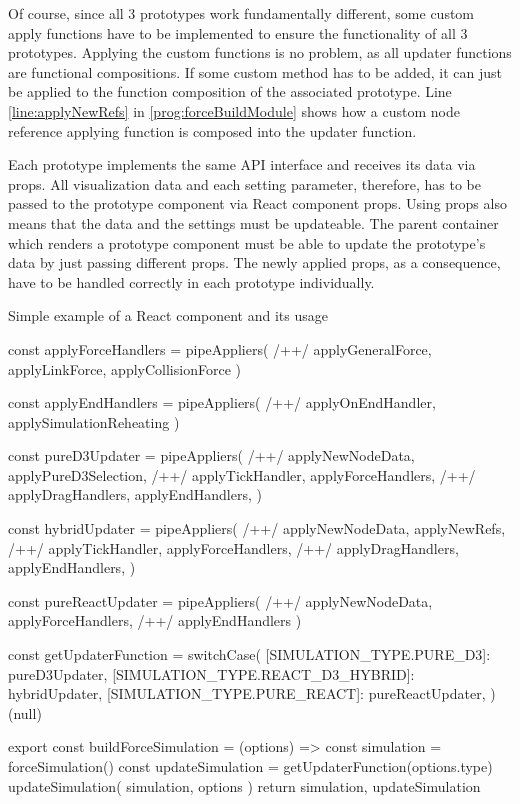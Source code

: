 Of course, since all 3 prototypes work fundamentally different, some custom apply functions have to be implemented to ensure the functionality of all 3 prototypes. Applying the custom functions is no problem, as all updater functions are functional compositions. If some custom method has to be added, it can just be applied to the function composition of the associated prototype. Line \ref{line:applyNewRefs} in \ref{prog:forceBuildModule} shows how a custom node reference applying function is composed into the updater function.

Each prototype implements the same API interface and receives its data via props. All visualization data and each setting parameter, therefore, has to be passed to the prototype component via React component props. Using props also means that the data and the settings must be updateable. The parent container which renders a prototype component must be able to update the prototype's data by just passing different props. The newly applied props, as a consequence, have to be handled correctly in each prototype individually.

\begin{program}[H]
\caption{Simple example of a React component and its usage} 
\label{prog:forceBuildModule}
\begin{JsCode}
const applyForceHandlers = pipeAppliers( /+\label{line:composition1}+/
  applyGeneralForce, 
  applyLinkForce, 
  applyCollisionForce
)

const applyEndHandlers = pipeAppliers( /+\label{line:composition2}+/
  applyOnEndHandler, 
  applySimulationReheating
)

const pureD3Updater = pipeAppliers( /+\label{line:updater1}+/
  applyNewNodeData,
  applyPureD3Selection, /+\label{line:applyPureD3Selection}+/
  applyTickHandler,
  applyForceHandlers, /+\label{line:applyForce1}+/
  applyDragHandlers,
  applyEndHandlers,
)

const hybridUpdater = pipeAppliers( /+\label{line:updater2}+/
  applyNewNodeData,
  applyNewRefs, /+\label{line:applyNewRefs}+/
  applyTickHandler,
  applyForceHandlers, /+\label{line:applyForce2}+/
  applyDragHandlers,
  applyEndHandlers,
)

const pureReactUpdater = pipeAppliers( /+\label{line:updater3}+/
  applyNewNodeData, 
  applyForceHandlers, /+\label{line:applyForce3}+/
  applyEndHandlers
)

const getUpdaterFunction = switchCase({
  [SIMULATION_TYPE.PURE_D3]: pureD3Updater,
  [SIMULATION_TYPE.REACT_D3_HYBRID]: hybridUpdater,
  [SIMULATION_TYPE.PURE_REACT]: pureReactUpdater,
})(null)

export const buildForceSimulation = (options) => {
  const simulation = forceSimulation()
  const updateSimulation = getUpdaterFunction(options.type)
  updateSimulation({ simulation, options })
  return { simulation, updateSimulation }
}
\end{JsCode}
\end{program}


